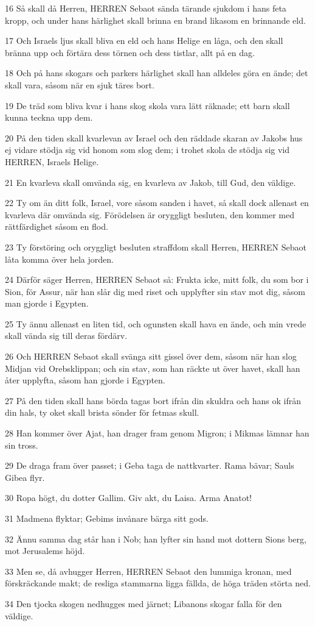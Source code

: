 \par 16 Så skall då Herren, HERREN Sebaot sända tärande sjukdom i hans feta kropp, och under hans härlighet skall brinna en brand likasom en brinnande eld.
\par 17 Och Israels ljus skall bliva en eld och hans Helige en låga, och den skall bränna upp och förtära dess törnen och dess tistlar, allt på en dag.
\par 18 Och på hans skogars och parkers härlighet skall han alldeles göra en ände; det skall vara, såsom när en sjuk täres bort.
\par 19 De träd som bliva kvar i hans skog skola vara lätt räknade; ett barn skall kunna teckna upp dem.
\par 20 På den tiden skall kvarlevan av Israel och den räddade skaran av Jakobs hus ej vidare stödja sig vid honom som slog dem; i trohet skola de stödja sig vid HERREN, Israels Helige.
\par 21 En kvarleva skall omvända sig, en kvarleva av Jakob, till Gud, den väldige.
\par 22 Ty om än ditt folk, Israel, vore såsom sanden i havet, så skall dock allenast en kvarleva där omvända sig. Förödelsen är oryggligt besluten, den kommer med rättfärdighet såsom en flod.
\par 23 Ty förstöring och oryggligt besluten straffdom skall Herren, HERREN Sebaot låta komma över hela jorden.
\par 24 Därför säger Herren, HERREN Sebaot så: Frukta icke, mitt folk, du som bor i Sion, för Assur, när han slår dig med riset och upplyfter sin stav mot dig, såsom man gjorde i Egypten.
\par 25 Ty ännu allenast en liten tid, och ogunsten skall hava en ände, och min vrede skall vända sig till deras fördärv.
\par 26 Och HERREN Sebaot skall svänga sitt gissel över dem, såsom när han slog Midjan vid Orebsklippan; och sin stav, som han räckte ut över havet, skall han åter upplyfta, såsom han gjorde i Egypten.
\par 27 På den tiden skall hans börda tagas bort ifrån din skuldra och hans ok ifrån din hals, ty oket skall brista sönder för fetmas skull.
\par 28 Han kommer över Ajat, han drager fram genom Migron; i Mikmas lämnar han sin tross.
\par 29 De draga fram över passet; i Geba taga de nattkvarter. Rama bävar; Sauls Gibea flyr.
\par 30 Ropa högt, du dotter Gallim. Giv akt, du Laisa. Arma Anatot!
\par 31 Madmena flyktar; Gebims invånare bärga sitt gods.
\par 32 Ännu samma dag står han i Nob; han lyfter sin hand mot dottern Sions berg, mot Jerusalems höjd.
\par 33 Men se, då avhugger Herren, HERREN Sebaot den lummiga kronan, med förskräckande makt; de resliga stammarna ligga fällda, de höga träden störta ned.
\par 34 Den tjocka skogen nedhugges med järnet; Libanons skogar falla för den väldige.

